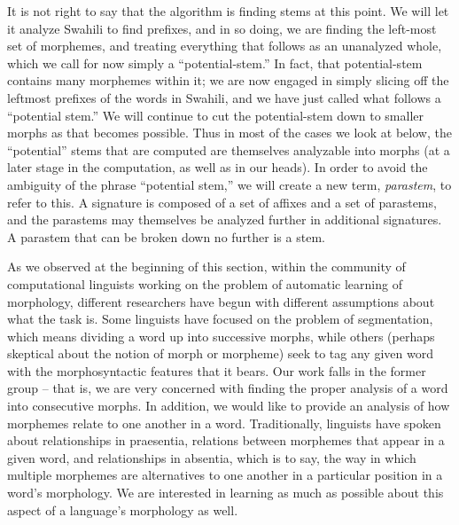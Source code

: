 \documentclass[output=paper,colorlinks,citecolor=brown]{langscibook}
\begin{document}
It is not right to say that the algorithm is finding stems at this point. We will let it analyze Swahili to find prefixes, and in so doing, we are finding the left-most set of morphemes, and treating everything that follows as an unanalyzed whole, which we call for now simply a ``potential-stem.'' In fact, that potential-stem contains many morphemes within it; we are now engaged in simply slicing off the leftmost prefixes of the words in Swahili, and we have just called what follows a ``potential stem.''  We will continue to cut the potential-stem down to smaller morphs as that becomes possible. Thus in most of the cases we look at below, the ``potential'' stems that are computed are themselves analyzable into morphs (at a later stage in the computation, as well as in our heads). In order to avoid the ambiguity of the phrase ``potential stem,'' we will create a new term, \textit{parastem}, to refer to this. A signature is composed of a set of affixes and a set of parastems, and the parastems may themselves be analyzed further in additional signatures. A parastem that can be broken down no further is a stem.

As we observed at the beginning of this section, within the community of computational linguists working on the problem of automatic learning of morphology, different researchers have begun with different assumptions about what the task is. Some linguists have focused on the problem of segmentation, which means dividing a word up into successive morphs, while others (perhaps skeptical about the notion of morph or morpheme) seek to tag any given word with the morphosyntactic features that it bears. Our work falls in the former group -- that is, we are very concerned with finding the proper analysis of a word into consecutive morphs. In addition, we would like to provide an analysis of how morphemes relate to one another in a word. Traditionally, linguists have spoken about relationships in praesentia, relations between morphemes that appear in a given word, and relationships in absentia, which is to say, the way in which multiple morphemes are alternatives to one another in a particular position in a word's morphology. We are interested in learning as much as possible about this aspect of a language's morphology as well.
 
\end{document}
